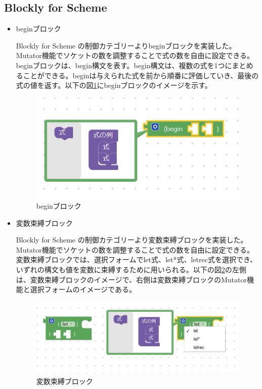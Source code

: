 \documentclass{risepaper}
\begin{document}
   \subsection{Blockly for Scheme}
   
\begin{itemize}   

\item beginブロック

Blockly for Scheme の制御カテゴリーよりbeginブロックを実装した。Mutator機能でソケットの数を調整することで式の数を自由に設定できる。beginブロックは、begin構文を表す。begin構文は、複数の式を1つにまとめることができる。beginは与えられた式を前から順番に評価していき、最後の式の値を返す。以下の図\ref{fig:scheme_begin}にbeginブロックのイメージを示す。

\begin{figure}[h]
\begin{center}
\includegraphics[scale=0.5]{img/scheme_begin.PNG}
\caption{beginブロック}%
\label{fig:scheme_begin}
\end{center}%
\end{figure}%

\item 変数束縛ブロック

Blockly for Scheme の制御カテゴリーより変数束縛ブロックを実装した。Mutator機能でソケットの数を調整することで式の数を自由に設定できる。変数束縛ブロックでは、選択フォームでlet式、let*式、letrec式を選択でき、いずれの構文も値を変数に束縛するために用いられる。以下の図\ref{fig:scheme_binding}の左側は、変数束縛ブロックのイメージで、右側は変数束縛ブロックのMutator機能と選択フォームのイメージである。

\begin{figure}[h]
\begin{center}
\includegraphics[scale=0.5]{img/scheme_binding.PNG}
\caption{変数束縛ブロック}%
\label{fig:scheme_binding}
\end{center}%
\end{figure}%


\end{itemize}
\end{document}

